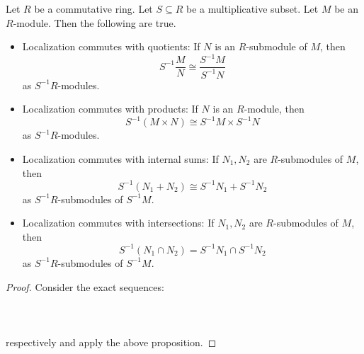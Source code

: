\documentclass[a4paper]{article}
\begin{document}
\begin{crl}{}{} Let $R$ be a commutative ring. Let $S\subseteq R$ be a multiplicative subset. Let $M$ be an $R$-module. Then the following are true. 
\begin{itemize}
\item Localization commutes with quotients: If $N$ is an $R$-submodule of $M$, then $$S^{-1}\frac{M}{N}\cong\frac{S^{-1}M}{S^{-1}N}$$ as $S^{-1}R$-modules. 
\item Localization commutes with products: If $N$ is an $R$-module, then $$S^{-1}(M\times N)\cong S^{-1}M\times S^{-1}N$$ as $S^{-1}R$-modules. 
\item Localization commutes with internal sums: If $N_1,N_2$ are $R$-submodules of $M$, then $$S^{-1}(N_1+N_2)\cong S^{-1}N_1+S^{-1}N_2$$ as $S^{-1}R$-submodules of $S^{-1}M$. 
\item Localization commutes with intersections: If $N_1,N_2$ are $R$-submodules of $M$, then $$S^{-1}(N_1\cap N_2)=S^{-1}N_1\cap S^{-1}N_2$$ as $S^{-1}R$-submodules of $S^{-1}M$. 
\end{itemize} \tcbline
\begin{proof}
Consider the exact sequences: \\~\\
\\~\\
respectively and apply the above proposition. 
\end{proof}
\end{crl}
\end{document}
